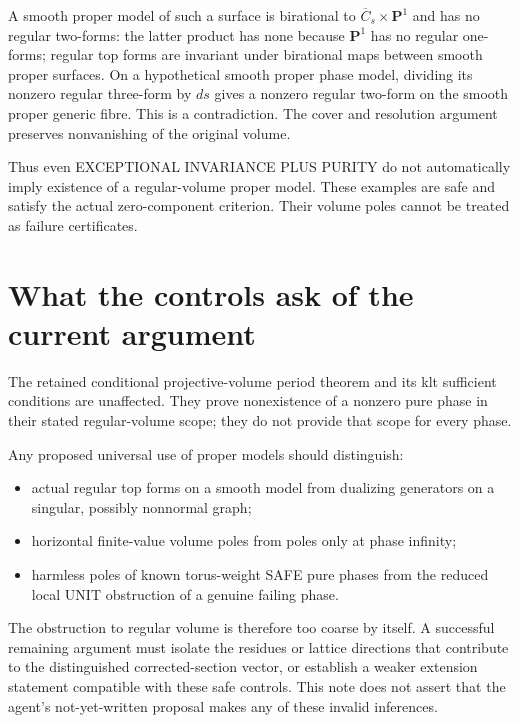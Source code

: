\documentclass{article}
\begin{document}
A smooth proper model of such a surface is birational to $\overline C_s\times\mathbf P^1$ and has no regular two-forms: the latter product has none because $\mathbf P^1$ has no regular one-forms; regular top forms are invariant under birational maps between smooth proper surfaces. On a hypothetical smooth proper phase model, dividing its nonzero regular three-form by $ds$ gives a nonzero regular two-form on the smooth proper generic fibre. This is a contradiction. The cover and resolution argument preserves nonvanishing of the original volume.

Thus even EXCEPTIONAL INVARIANCE PLUS PURITY do not automatically imply existence of a regular-volume proper model. These examples are safe and satisfy the actual zero-component criterion. Their volume poles cannot be treated as failure certificates.

\section{What the controls ask of the current argument}
The retained conditional projective-volume period theorem and its klt sufficient conditions are unaffected. They prove nonexistence of a nonzero pure phase in their stated regular-volume scope; they do not provide that scope for every phase.

Any proposed universal use of proper models should distinguish:
\begin{itemize}
\item actual regular top forms on a smooth model from dualizing generators on a singular, possibly nonnormal graph;
\item horizontal finite-value volume poles from poles only at phase infinity;
\item harmless poles of known torus-weight SAFE pure phases from the reduced local UNIT obstruction of a genuine failing phase.
\end{itemize}
The obstruction to regular volume is therefore too coarse by itself. A successful remaining argument must isolate the residues or lattice directions that contribute to the distinguished corrected-section vector, or establish a weaker extension statement compatible with these safe controls. This note does not assert that the agent's not-yet-written proposal makes any of these invalid inferences.
\end{document}
